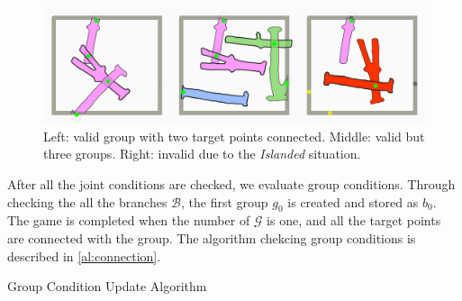 \begin{figure}[ht]
  \begin{center}
    \includegraphics[width = 0.4\paperwidth]{images/interface/groups.jpg}
    \caption{Left: valid group with two target points connected. Middle: valid but three groups. Right: invalid due to the \textit{Islanded} situation. }
    \label{fig:group}
  \end{center}
\end{figure}


After all the joint conditions are checked, we evaluate group conditions.
Through checking the all the branches $\mathcal{B}$, the first group $g_0$ is created and stored as $b_0$.
The game is completed when the number of $\mathcal{G}$ is one, and all the target points are connected with the group.
The algorithm chekcing group conditions is described in \ref{al:connection}.

\begin{algorithm}
  \caption{Group Condition Update Algorithm}
  \begin{algorithmic}[1]
    \EndIf

            \EndIf
            \EndIf
          \EndIf
        \EndFor
      \EndFor

      \EndIf
    \EndFor

  \EndFunction
  \end{algorithmic}
  \label{al:connection}
\end{algorithm}

